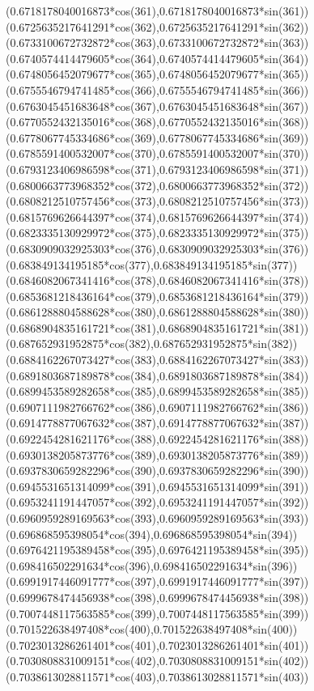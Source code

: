 {({0.6718178040016873*cos(361)},{0.6718178040016873*sin(361)})
({0.6725635217641291*cos(362)},{0.6725635217641291*sin(362)})
({0.6733100672732872*cos(363)},{0.6733100672732872*sin(363)})
({0.6740574414479605*cos(364)},{0.6740574414479605*sin(364)})
({0.6748056452079677*cos(365)},{0.6748056452079677*sin(365)})
({0.6755546794741485*cos(366)},{0.6755546794741485*sin(366)})
({0.6763045451683648*cos(367)},{0.6763045451683648*sin(367)})
({0.6770552432135016*cos(368)},{0.6770552432135016*sin(368)})
({0.6778067745334686*cos(369)},{0.6778067745334686*sin(369)})
({0.6785591400532007*cos(370)},{0.6785591400532007*sin(370)})
({0.6793123406986598*cos(371)},{0.6793123406986598*sin(371)})
({0.6800663773968352*cos(372)},{0.6800663773968352*sin(372)})
({0.6808212510757456*cos(373)},{0.6808212510757456*sin(373)})
({0.6815769626644397*cos(374)},{0.6815769626644397*sin(374)})
({0.6823335130929972*cos(375)},{0.6823335130929972*sin(375)})
({0.6830909032925303*cos(376)},{0.6830909032925303*sin(376)})
({0.683849134195185*cos(377)},{0.683849134195185*sin(377)})
({0.6846082067341416*cos(378)},{0.6846082067341416*sin(378)})
({0.6853681218436164*cos(379)},{0.6853681218436164*sin(379)})
({0.6861288804588628*cos(380)},{0.6861288804588628*sin(380)})
({0.6868904835161721*cos(381)},{0.6868904835161721*sin(381)})
({0.687652931952875*cos(382)},{0.687652931952875*sin(382)})
({0.6884162267073427*cos(383)},{0.6884162267073427*sin(383)})
({0.6891803687189878*cos(384)},{0.6891803687189878*sin(384)})
({0.6899453589282658*cos(385)},{0.6899453589282658*sin(385)})
({0.6907111982766762*cos(386)},{0.6907111982766762*sin(386)})
({0.6914778877067632*cos(387)},{0.6914778877067632*sin(387)})
({0.6922454281621176*cos(388)},{0.6922454281621176*sin(388)})
({0.6930138205873776*cos(389)},{0.6930138205873776*sin(389)})
({0.6937830659282296*cos(390)},{0.6937830659282296*sin(390)})
({0.6945531651314099*cos(391)},{0.6945531651314099*sin(391)})
({0.6953241191447057*cos(392)},{0.6953241191447057*sin(392)})
({0.6960959289169563*cos(393)},{0.6960959289169563*sin(393)})
({0.696868595398054*cos(394)},{0.696868595398054*sin(394)})
({0.6976421195389458*cos(395)},{0.6976421195389458*sin(395)})
({0.698416502291634*cos(396)},{0.698416502291634*sin(396)})
({0.6991917446091777*cos(397)},{0.6991917446091777*sin(397)})
({0.6999678474456938*cos(398)},{0.6999678474456938*sin(398)})
({0.7007448117563585*cos(399)},{0.7007448117563585*sin(399)})
({0.701522638497408*cos(400)},{0.701522638497408*sin(400)})
({0.7023013286261401*cos(401)},{0.7023013286261401*sin(401)})
({0.7030808831009151*cos(402)},{0.7030808831009151*sin(402)})
({0.7038613028811571*cos(403)},{0.7038613028811571*sin(403)})
}
